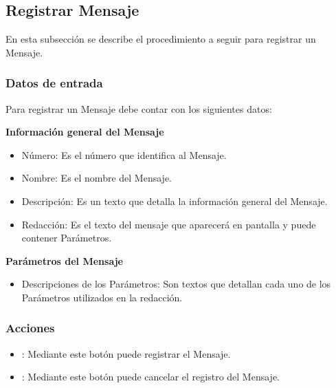 \subsection{Registrar Mensaje}
En esta subsección se describe el procedimiento a seguir para registrar un Mensaje.

\subsubsection{Datos de entrada}
\begin{description}
	\item Para registrar un Mensaje debe contar con los siguientes datos: \hspace{10pt}
	\begin{description}
	    \item \textbf{Información general del Mensaje}
	    \begin{itemize}
		  \item Número: Es el número que identifica al Mensaje.
		  \item Nombre: Es el nombre del Mensaje.
		  \item Descripción: Es un texto que detalla la información general del Mensaje.
		  \item Redacción: Es el texto del mensaje que aparecerá en pantalla y puede contener Parámetros.
	    \end{itemize}
	    \item \textbf{Parámetros del Mensaje}    
	    \begin{itemize}
		  \item Descripciones de los Parámetros: Son textos que detallan cada uno de los Parámetros utilizados en la redacción.
	    \end{itemize}

	 \end{description}
\end{description}

\subsubsection{Acciones}
\begin{itemize}
 \item {}: Mediante este botón puede registrar el Mensaje.
 \item {}: Mediante este botón puede cancelar el registro del Mensaje.
\end{itemize}
	

